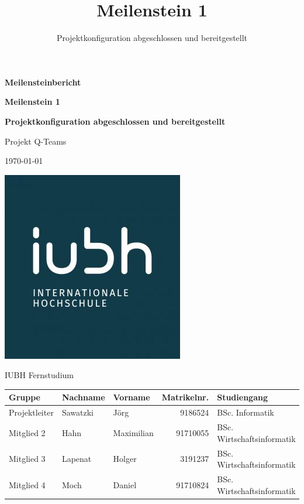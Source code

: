\documentclass[a4paper,11pt,listof=numbered,glossary=totoc,parskip=half,toc=bib]{scrreprt}
\title{Meilenstein 1}
\subtitle{Projektkonfiguration abgeschlossen und bereitgestellt}
\begin{document}
	\begin{titlepage}
		
		\centering
		\vspace*{2.5cm}
		{\large\bfseries Meilensteinbericht\par}	
		{\Huge\bfseries Meilenstein 1\par}
		{\Large\bfseries Projektkonfiguration abgeschlossen und bereitgestellt\par}

		{\Large Projekt Q-Teams\par}
		{\large\today\par}
		\vspace{0.5cm}

			
		
		\includegraphics[scale=0.5]{iubh_logo}
		
		IUBH Fernstudium
		\vspace{0.5cm}
		
		\begin{tabular}{lllrl}
			\toprule
			\textbf{Gruppe} & \textbf{Nachname} & \textbf{Vorname} & \textbf{Matrikelnr.} & \textbf{Studiengang} \\
			\midrule
			Projektleiter & Sawatzki & Jörg & 9186524 & BSc. Informatik \\
			Mitglied 2 & Hahn & Maximilian & 91710055 & BSc. Wirtschaftsinformatik \\
			Mitglied 3 & Lapenat & Holger & 3191237 & BSc. Wirtschaftsinformatik \\
			Mitglied 4 & Moch & Daniel & 91710824 & BSc. Wirtschaftsinformatik \\
			\bottomrule
		\end{tabular}	
	\end{titlepage}
	
\end{document}
